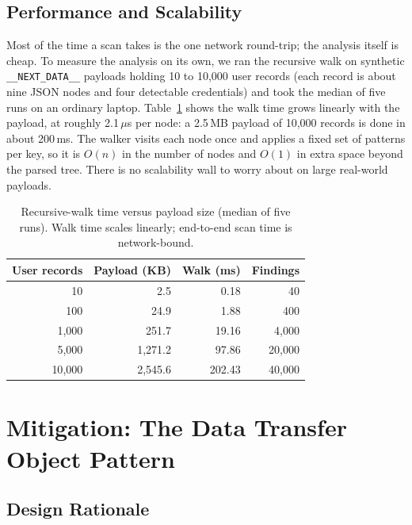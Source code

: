 \documentclass[runningheads]{llncs}
\begin{document}
\subsection{Performance and Scalability}
\label{sec:perf}

Most of the time a scan takes is the one network round-trip; the analysis
itself is cheap.  To measure the analysis on its own, we ran the recursive
walk on synthetic \texttt{\_\_NEXT\_DATA\_\_} payloads holding 10 to
10{,}000 user records (each record is about nine JSON nodes and four
detectable credentials) and took the median of five runs on an ordinary
laptop.  Table~\ref{tab:perf} shows the walk time grows linearly with the
payload, at roughly 2.1\,$\mu$s per node: a 2.5\,MB payload of 10{,}000
records is done in about 200\,ms.  The walker visits each node once and
applies a fixed set of patterns per key, so it is $O(n)$ in the number of
nodes and $O(1)$ in extra space beyond the parsed tree.  There is no
scalability wall to worry about on large real-world payloads.

\begin{table}[tbp]
  \caption{Recursive-walk time versus payload size (median of five runs).
    Walk time scales linearly; end-to-end scan time is network-bound.}
  \label{tab:perf}
  \centering
  \begin{tabular}{rrrr}
    \toprule
    \textbf{User records} & \textbf{Payload (KB)} & \textbf{Walk (ms)} & \textbf{Findings} \\
    \midrule
    10      & 2.5      & 0.18   & 40 \\
    100     & 24.9     & 1.88   & 400 \\
    1{,}000   & 251.7    & 19.16  & 4{,}000 \\
    5{,}000   & 1{,}271.2  & 97.86  & 20{,}000 \\
    10{,}000  & 2{,}545.6  & 202.43 & 40{,}000 \\
    \bottomrule
  \end{tabular}
\end{table}

\section{Mitigation: The Data Transfer Object Pattern}
\label{sec:mitigation}

\subsection{Design Rationale}
\end{document}
